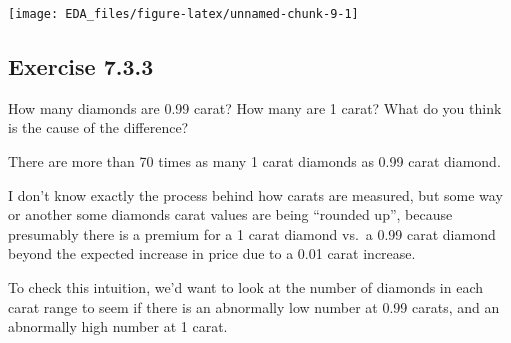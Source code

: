 \documentclass[]{book}
\newenvironment{Shaded}{\begin{snugshade}}{\end{snugshade}}
\newcommand{\CommentTok}[1]{\textcolor[rgb]{0.56,0.35,0.01}{\textit{#1}}}
\newcommand{\DecValTok}[1]{\textcolor[rgb]{0.00,0.00,0.81}{#1}}
\newcommand{\FloatTok}[1]{\textcolor[rgb]{0.00,0.00,0.81}{#1}}
\newcommand{\KeywordTok}[1]{\textcolor[rgb]{0.13,0.29,0.53}{\textbf{#1}}}
\newcommand{\NormalTok}[1]{#1}
\newcommand{\OperatorTok}[1]{\textcolor[rgb]{0.81,0.36,0.00}{\textbf{#1}}}
\newcommand{\StringTok}[1]{\textcolor[rgb]{0.31,0.60,0.02}{#1}}
\theoremstyle{plain}
\theoremstyle{remark}
\begin{document}
\begin{center}\texttt{[image: EDA\_files/figure-latex/unnamed-chunk-9-1]} \end{center}

\hypertarget{exercise-7.3.3}{%
\subsection*{\texorpdfstring{Exercise
{7.3.3}}{Exercise 7.3.3}}\label{exercise-7.3.3}}

How many diamonds are 0.99 carat? How many are 1 carat? What do you
think is the cause of the difference?

There are more than 70 times as many 1 carat diamonds as 0.99 carat
diamond.

\begin{Shaded}
\end{Shaded}

I don't know exactly the process behind how carats are measured, but
some way or another some diamonds carat values are being ``rounded up'',
because presumably there is a premium for a 1 carat diamond vs.~a 0.99
carat diamond beyond the expected increase in price due to a 0.01 carat
increase.

To check this intuition, we'd want to look at the number of diamonds in
each carat range to seem if there is an abnormally low number at 0.99
carats, and an abnormally high number at 1 carat.
\end{document}
